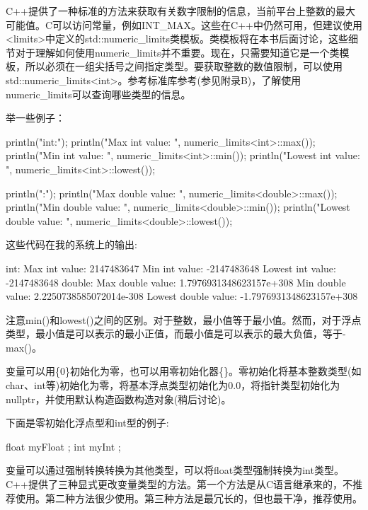 
C++提供了一种标准的方法来获取有关数字限制的信息，当前平台上整数的最大可能值。C可以访问常量，例如INT\_MAX。这些在C++中仍然可用，但建议使用<limits>中定义的std::numeric\_limits类模板。类模板将在本书后面讨论，这些细节对于理解如何使用numeric\_limits并不重要。现在，只需要知道它是一个类模板，所以必须在一组尖括号之间指定类型。要获取整数的数值限制，可以使用std::numeric\_limits<int>。参考标准库参考(参见附录B)，了解使用numeric\_limits可以查询哪些类型的信息。

举一些例子：

\begin{cpp}
println("int:");
println("Max int value: {}", numeric_limits<int>::max());
println("Min int value: {}", numeric_limits<int>::min());
println("Lowest int value: {}", numeric_limits<int>::lowest());

println("\ndouble:");
println("Max double value: {}", numeric_limits<double>::max());
println("Min double value: {}", numeric_limits<double>::min());
println("Lowest double value: {}", numeric_limits<double>::lowest());
\end{cpp}

这些代码在我的系统上的输出:

\begin{shell}
int:
Max int value: 2147483647
Min int value: -2147483648
Lowest int value: -2147483648
double:
Max double value: 1.7976931348623157e+308
Min double value: 2.2250738585072014e-308
Lowest double value: -1.7976931348623157e+308
\end{shell}

注意min()和lowest()之间的区别。对于整数，最小值等于最小值。然而，对于浮点类型，最小值是可以表示的最小正值，而最小值是可以表示的最大负值，等于-max()。


变量可以用\{0\}初始化为零，也可以用零初始化器\{\}。零初始化将基本整数类型(如char、int等)初始化为零，将基本浮点类型初始化为0.0，将指针类型初始化为nullptr，并使用默认构造函数构造对象(稍后讨论)。

下面是零初始化浮点型和int型的例子:

\begin{cpp}
float myFloat {};
int myInt {};
\end{cpp}


变量可以通过强制转换转换为其他类型，可以将float类型强制转换为int类型。C++提供了三种显式更改变量类型的方法。第一个方法是从C语言继承来的，不推荐使用。第二种方法很少使用。第三种方法是最冗长的，但也最干净，推荐使用。

